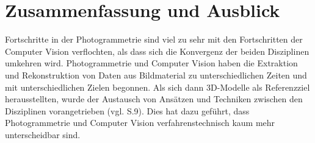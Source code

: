 \chapter{Zusammenfassung und Ausblick}


Fortschritte in der Photogrammetrie sind viel zu sehr mit den Fortschritten der Computer Vision verflochten, als dass sich die Konvergenz der beiden Disziplinen umkehren wird. Photogrammetrie und Computer Vision haben die Extraktion und Rekonstruktion von Daten aus Bildmaterial zu unterschiedlichen Zeiten und mit unterschiedlichen Zielen begonnen. Als sich dann 3D-Modelle als Referenzziel herausstellten, wurde der Austausch von Ansätzen und Techniken zwischen den Disziplinen vorangetrieben (vgl. \cite{state_of_art} S.9). Dies hat dazu geführt, dass Photogrammetrie und Computer Vision verfahrenstechnisch kaum mehr unterscheidbar sind.
	
